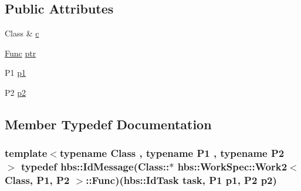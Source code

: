 \subsection*{Public Attributes}
\begin{DoxyCompactItemize}
\item 
Class \& \hyperlink{structhbs_1_1_work_spec_1_1_work2_a9ce24aa0ba2d7a16b4ab428f3612d73f}{c}
\item 
\hyperlink{structhbs_1_1_work_spec_1_1_work2_a029470a2ff656e7a643d9e074254dd77}{Func} \hyperlink{structhbs_1_1_work_spec_1_1_work2_a92100158ede3a93764cb3d511bd85f39}{ptr}
\item 
P1 \hyperlink{structhbs_1_1_work_spec_1_1_work2_a340ca28ca16ad76091a899e183ed48c1}{p1}
\item 
P2 \hyperlink{structhbs_1_1_work_spec_1_1_work2_a2d8479e3bbdf73c26b1199073757390f}{p2}
\end{DoxyCompactItemize}


\subsection{Member Typedef Documentation}
\hypertarget{structhbs_1_1_work_spec_1_1_work2_a029470a2ff656e7a643d9e074254dd77}{
\subsubsection[{Func}]{\setlength{\rightskip}{0pt plus 5cm}template$<$typename Class , typename P1 , typename P2 $>$ typedef {\bf hbs\-::\-Id\-Message}(Class\-::$\ast$ {\bf hbs\-::\-Work\-Spec\-::\-Work2}$<$ Class, P1, P2 $>$\-::Func)({\bf hbs\-::\-Id\-Task} task, P1 {\bf p1}, P2 {\bf p2})}}\label{structhbs_1_1_work_spec_1_1_work2_a029470a2ff656e7a643d9e074254dd77}


